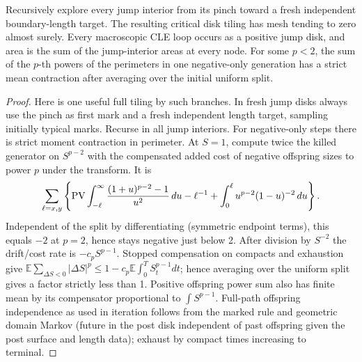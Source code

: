 \begin{lemma}\label{cut:tiling}
Recursively explore every jump interior from its pinch toward a fresh
independent boundary-length target.  The resulting critical disk tiling has
mesh tending to zero almost surely.  Every macroscopic CLE loop occurs as a
positive jump disk, and area is the sum of the jump-interior areas at every
node.  For some \(p<2\), the sum of the \(p\)-th powers of the perimeters in
one negative-only generation has a strict mean contraction after averaging
over the initial uniform split.
\end{lemma}
\begin{proof}\leavevmode

Here is one useful full tiling by such branches. In fresh jump disks always use the pinch as first mark and a fresh independent length target, sampling initially typical marks. Recurse in all jump interiors. For negative-only steps there is strict moment contraction in perimeter. At \(S=1\), compute twice the killed generator on \(S^{p-2}\) with the compensated added cost of negative offspring sizes to power \(p\) under the transform. It is
\[
 \sum_{\ell=x,y}
 \left\{{\rm PV}\int_{-\ell}^\infty\frac{(1+u)^{p-2}-1}{u^2}\,du-\ell^{-1}
 +\int_0^\ell u^{p-2}(1-u)^{-2}\,du\right\}.
\]
Independent of the split by differentiating (symmetric endpoint terms), this equals \(-2\) at \(p=2\), hence stays negative just below 2.
After division by \(S^{-2}\) the drift/cost rate is \(-c_p S^{p-1}\).
Stopped compensation on compacts and exhaustion give \(\mathbb E\sum_{\Delta S<0}|\Delta S|^p\le1-c_p\mathbb E\int_0^T S_t^{p-1}dt\); hence averaging over the uniform split gives a factor strictly less than 1.
Positive offspring power sum also has finite mean by its compensator proportional to \(\int S^{p-1}\).
Full-path offspring independence as used in iteration follows from the marked rule and geometric domain Markov (future in the post disk independent of past offspring given the post surface and length data); exhaust by compact times increasing to terminal.


\end{proof}

